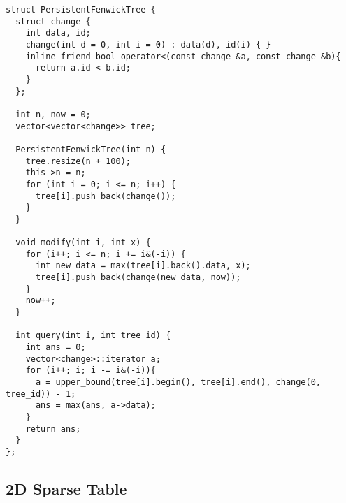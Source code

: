 \begin{lstlisting}
struct PersistentFenwickTree {
  struct change {
    int data, id;
    change(int d = 0, int i = 0) : data(d), id(i) { }
    inline friend bool operator<(const change &a, const change &b){
      return a.id < b.id;
    }
  };

  int n, now = 0;
  vector<vector<change>> tree;

  PersistentFenwickTree(int n) {
    tree.resize(n + 100);
    this->n = n;
    for (int i = 0; i <= n; i++) {
      tree[i].push_back(change());
    }
  }
  
  void modify(int i, int x) {
    for (i++; i <= n; i += i&(-i)) {
      int new_data = max(tree[i].back().data, x);
      tree[i].push_back(change(new_data, now));
    }
    now++;
  }

  int query(int i, int tree_id) {
    int ans = 0;
    vector<change>::iterator a;
    for (i++; i; i -= i&(-i)){
      a = upper_bound(tree[i].begin(), tree[i].end(), change(0, tree_id)) - 1;
      ans = max(ans, a->data);
    }
    return ans;
  }
};
\end{lstlisting}

\newpage

\subsection{2D Sparse Table}

\cite{ShahjalalShohag2022Dec}

